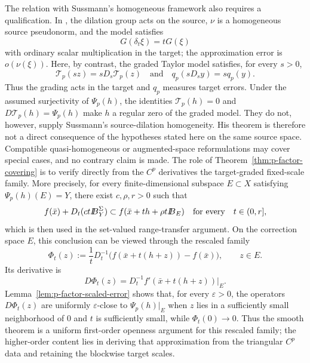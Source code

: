 \documentclass[11pt]{amsart}
\theoremstyle{definition}
\theoremstyle{remark}
\newcommand{\bx}{\bar x}
\def\ball{{I\kern -.35em B}}
\begin{document}
	The relation with Sussmann's homogeneous framework also requires a
	qualification. In \cite[Definitions~6, 8, and~11 and
	Theorem~12]{SussmannHighOrderOpen}, the dilation group acts on the source,
	$\nu$ is a homogeneous source pseudonorm, and the model satisfies
	$$
	G(\delta_t\xi)=tG(\xi)
	$$
	with ordinary scalar multiplication in the target; the approximation error
	is $o(\nu(\xi))$. Here, by contrast, the graded Taylor model satisfies, for
	every $s>0$,
	$$
	\mathcal T_p(sz)=sD_s\mathcal T_p(z)
	\quad\text{and}\quad
	q_p(sD_sy)=sq_p(y).
	$$
	Thus the grading acts in the target and $q_p$ measures target errors.
	Under the assumed surjectivity of $\Psi_p(h)$, the identities
	$\mathcal T_p(h)=0$ and $D\mathcal T_p(h)=\Psi_p(h)$ make $h$ a regular
	zero of the graded model. They do not, however, supply Sussmann's
	source-dilation homogeneity. His theorem is therefore not a direct
	consequence of the hypotheses stated here on the same source space. Compatible
	quasi-homogeneous or augmented-space reformulations may cover special
	cases, and no contrary claim is made. The role of
	Theorem~\ref{thm:p-factor-covering} is to verify directly from the
	$C^p$ derivatives the target-graded fixed-scale family. More precisely, for
	every finite-dimensional subspace $E\subset X$ satisfying
	$\Psi_p(h)(E)=Y$, there exist $c,\rho,r>0$ such that
	\begin{equation}
		\label{eq:intro-openness}
		f(\bx)+D_t(ct\ball_Y^\Sigma)
		\subset f(\bx+th+\rho t\ball_E)
		\quad\text{for every}\quad t\in(0,r],
	\end{equation}
	which is then used in the set-valued range-transfer argument. On the correction
	space $E$, this conclusion can be viewed through the rescaled family
	$$
	\Phi_t(z):=\frac{1}{t}D_t^{-1}
	\bigl(f(\bx+t(h+z))-f(\bx)\bigr),
	\qquad z\in E.
	$$
	Its derivative is
	$$
	D\Phi_t(z)=D_t^{-1}f'(\bx+t(h+z))\vert_E.
	$$
	Lemma~\ref{lem:p-factor-scaled-error} shows that, for every
	$\varepsilon>0$, the operators $D\Phi_t(z)$ are uniformly
	$\varepsilon$-close to $\Psi_p(h)\vert_E$ when $z$ lies in a sufficiently
	small neighborhood of $0$ and $t$ is sufficiently small, while
	$\Phi_t(0)\to0$. Thus the smooth theorem is a uniform first-order openness
	argument for this rescaled family; the higher-order content lies in deriving
	that approximation from the triangular $C^p$ data and retaining the
	blockwise target scales.
	
\end{document}

